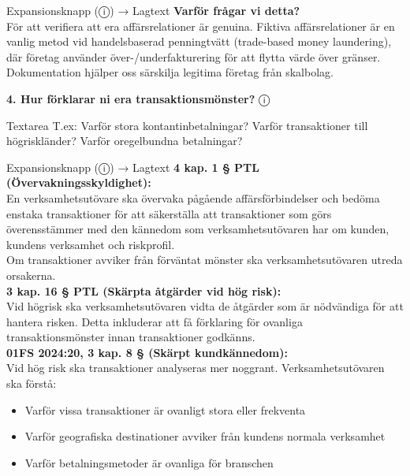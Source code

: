 \documentclass[10pt]{beamer}
\begin{document}
\begin{frame}[label=riskfragor-steg4-fortsattning]
\begin{alertblock}{Expansionsknapp (ⓘ) → Lagtext}
    \tiny \textbf{Varför frågar vi detta?}\\
    \tiny För att verifiera att era affärsrelationer är genuina. Fiktiva affärsrelationer är en vanlig metod vid
    handelsbaserad penningtvätt (trade-based money laundering), där företag använder över-/underfakturering
    för att flytta värde över gränser. Dokumentation hjälper oss särskilja legitima företag från skalbolag.
  \end{alertblock}

  \vspace{0.4cm}

  \textbf{4. Hur förklarar ni era transaktionsmönster?} \hspace{0.3cm} ⓘ\\
  \begin{block}{Textarea}
    \tiny T.ex: Varför stora kontantinbetalningar? Varför transaktioner till högriskländer? 
    Varför oregelbundna betalningar?
  \end{block}
  \begin{alertblock}{Expansionsknapp (ⓘ) → Lagtext}
    \tiny \textbf{4 kap. 1 § PTL (Övervakningsskyldighet):}\\
    \tiny En verksamhetsutövare ska övervaka pågående affärsförbindelser och bedöma enstaka transaktioner
    för att säkerställa att transaktioner som görs överensstämmer med den kännedom som verksamhetsutövaren
    har om kunden, kundens verksamhet och riskprofil.\\
    \tiny Om transaktioner avviker från förväntat mönster ska verksamhetsutövaren utreda orsakerna.\\[0.1cm]
    
    \tiny \textbf{3 kap. 16 § PTL (Skärpta åtgärder vid hög risk):}\\
    \tiny Vid högrisk ska verksamhetsutövaren vidta de åtgärder som är nödvändiga för att hantera risken.
    Detta inkluderar att få förklaring för ovanliga transaktionsmönster innan transaktioner godkänns.\\[0.1cm]
    
    \tiny \textbf{01FS 2024:20, 3 kap. 8 § (Skärpt kundkännedom):}\\
    \tiny Vid hög risk ska transaktioner analyseras mer noggrant. Verksamhetsutövaren ska förstå:
    \begin{itemize}
      \item Varför vissa transaktioner är ovanligt stora eller frekventa
      \item Varför geografiska destinationer avviker från kundens normala verksamhet
      \item Varför betalningsmetoder är ovanliga för branschen
    \end{itemize}
    \vspace{0.1cm}
    

\end{alertblock}
\end{frame}
\end{document}
